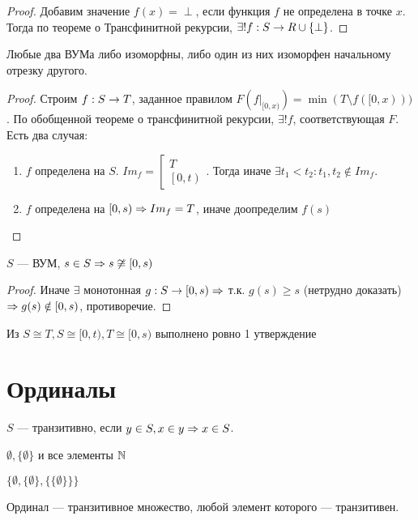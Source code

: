 \begin{proof}
    Добавим значение \(f(x) = \perp\), если функция \(f\) не определена в точке \(x\). Тогда по теореме о Трансфинитной рекурсии, \(\exists! f: S \rightarrow R \cup \{\perp\}\).
\end{proof}
\begin{theorem}
    Любые два ВУМа либо изоморфны, либо один из них изоморфен начальному отрезку другого.
\end{theorem}
\begin{proof}
    Строим \(f: S \rightarrow T\), заданное правилом \(F(f|_{[0, x)}) = \min (T \setminus f([0, x)))\). По обобщенной теореме о трансфинитной рекурсии, \(\exists! f\), соответствующая \(F\). Есть два случая:
    \begin{enumerate}
        \item \(f\) определена на \(S\). \(Im_f = \left[\begin{array}{l}
            T \\
            \left[0, t\right)
        \end{array}\right.\). Тогда  иначе \(\exists t_1 < t_2: t_1, t_2 \notin Im_f\).
        \item \(f\) определена на \([0, s) \Rightarrow Im_f = T\), иначе доопределим \(f(s)\)
    \end{enumerate}
\end{proof}

\begin{proposition}
    \(S\) --- ВУМ, \(s \in S \Rightarrow s \not\cong [0, s)\)
\end{proposition}
\begin{proof}
    Иначе \(\exists\) монотонная \(g: S \rightarrow [0, s) \Rightarrow\) т.к. \(g(s) \ge s\) (нетрудно доказать) \(\Rightarrow g(s) \notin [0, s)\), противоречие.
\end{proof}
\begin{corollary}
    Из \(S \cong T, S \cong [0, t), T \cong [0, s)\) выполнено ровно 1 утверждение
\end{corollary}

\section{Ординалы}
\begin{definition}
    \(S\) --- транзитивно, если \(y \in S, x \in y \Rightarrow x \in S\).
\end{definition}
\begin{example}
    \(\emptyset, \{\emptyset\}\) и все элементы \(\mathbb{N}\)
\end{example}
\begin{example}
    \(\{\emptyset, \{\emptyset\}, \{\{\emptyset\}\}\}\)
\end{example}
\begin{definition}
    Ординал --- транзитивное множество, любой элемент которого --- транзитивен.
\end{definition}

